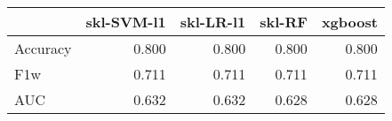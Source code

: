 \begin{tabular}{lrrrr}
\toprule
{} &  skl-SVM-l1 &  skl-LR-l1 &  skl-RF &  xgboost \\
\midrule
Accuracy &       0.800 &      0.800 &   0.800 &    0.800 \\
F1w      &       0.711 &      0.711 &   0.711 &    0.711 \\
AUC      &       0.632 &      0.632 &   0.628 &    0.628 \\
\bottomrule
\end{tabular}
